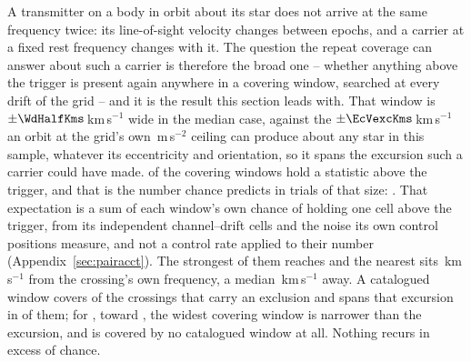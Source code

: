 A transmitter on a body in orbit about its star does not arrive at the same
frequency twice: its line-of-sight velocity changes between epochs, and a
carrier at a fixed rest frequency changes with it. The question the repeat
coverage can answer about such a carrier is therefore the broad one --
whether anything above the trigger is present again anywhere in a covering
window, searched at every drift of the grid -- and it is the result this
section leads with. That window is $\pm\WdHalfKms$\,km\,s$^{-1}$ wide in the
median case, against the $\pm\EcVexcKms$\,km\,s$^{-1}$ an orbit at the grid's
own \WdAGrid\,m\,s$^{-2}$ ceiling can produce about any star in this sample,
whatever its eccentricity and orientation, so it spans the excursion such a
carrier could have made. \WdNExc{} of the \WdNCov{} covering windows hold a
statistic above the trigger, and that is the number chance predicts in trials
of that size: \WdExpect. That expectation is a sum of each window's own
chance of holding one cell above the trigger, from its independent
channel--drift cells and the noise its own control positions measure, and
not a control rate applied to their number (Appendix~\ref{sec:pairacct}). The strongest of them reaches
\WdExcMax{} and the nearest sits \WdNearKms\,km\,s$^{-1}$ from the crossing's
own frequency, a median \WdMedKms\,km\,s$^{-1}$ away. A catalogued window
covers \WdNOrbTot{} of the \RcNExcl{} crossings that carry an exclusion and
spans that excursion in \EcNSpan{} of them; for \EcNShort, toward
\EcShortStarList, the widest covering window is narrower than the excursion,
and \WdNNoCov{} is covered by no catalogued window at all. Nothing recurs in
excess of chance.

